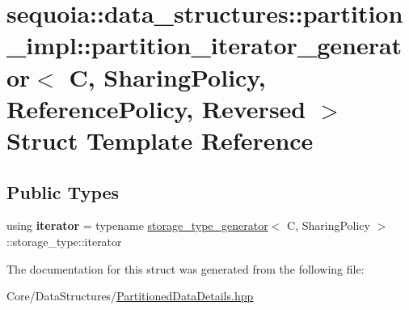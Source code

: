 \hypertarget{structsequoia_1_1data__structures_1_1partition__impl_1_1partition__iterator__generator}{}\section{sequoia\+::data\+\_\+structures\+::partition\+\_\+impl\+::partition\+\_\+iterator\+\_\+generator$<$ C, Sharing\+Policy, Reference\+Policy, Reversed $>$ Struct Template Reference}
\label{structsequoia_1_1data__structures_1_1partition__impl_1_1partition__iterator__generator}
\subsection*{Public Types}
\begin{DoxyCompactItemize}
\item 
\mbox{\label{structsequoia_1_1data__structures_1_1partition__impl_1_1partition__iterator__generator_a9d12d9e101e5c2623536f6562e7f9d1f}} 
using {\bfseries iterator} = typename \mbox{\hyperlink{structsequoia_1_1data__structures_1_1partition__impl_1_1storage__type__generator}{storage\+\_\+type\+\_\+generator}}$<$ C, Sharing\+Policy $>$\+::storage\+\_\+type\+::iterator
\end{DoxyCompactItemize}


The documentation for this struct was generated from the following file\+:\begin{DoxyCompactItemize}
\item 
Core/\+Data\+Structures/\mbox{\hyperlink{_partitioned_data_details_8hpp}{Partitioned\+Data\+Details.\+hpp}}\end{DoxyCompactItemize}
